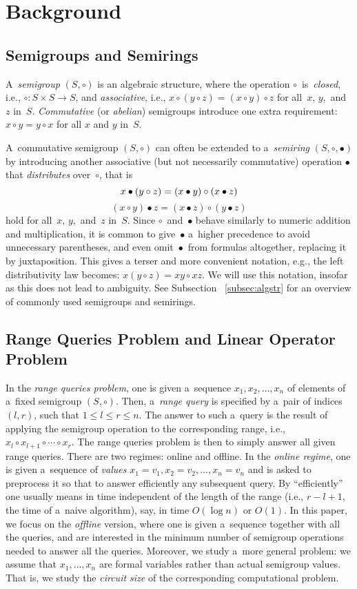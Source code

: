 \documentclass[11pt,letterpaper]{article}
\begin{document}
\section{Background}
\subsection{Semigroups and Semirings}
A~\emph{semigroup} $(S, \circ)$ is an algebraic structure, where
the operation
$\circ$~is~\emph{closed}, i.e., $\circ : S\times S \rightarrow S$,
and
\emph{associative}, i.e.,
$x \circ (y \circ z) = (x \circ y) \circ z$ for all~$x$, $y$,~and~$z$
in~$S$.
\emph{Commutative} (or \emph{abelian}) semigroups introduce
one extra requirement: $x \circ y = y \circ x$ for all $x$ and $y$
in~$S$.

A~commutative semigroup $(S, \circ)$ can often be extended to
a~\emph{semiring} $(S, \circ, \bullet)$ by introducing
another associative (but not necessarily
commutative)
operation $\bullet$ that \emph{distributes} over~$\circ$, that is
\[
x \bullet (y \circ z) = (x \bullet y) \circ (x \bullet z)\\
\]
\[
(x \circ y) \bullet z = (x \bullet z) \circ (y \bullet z)
\]
hold for all~$x$, $y$,~and~$z$ in~$S$.
Since $\circ$~and~$\bullet$ behave
similarly to numeric addition and multiplication, it is common to
give~$\bullet$ a~higher precedence to avoid
unnecessary parentheses, and even omit~$\bullet$~from
formulas altogether, replacing it by juxtaposition.
This gives a terser and
more convenient notation, e.g., the left distributivity law becomes:
$x (y \circ z) = x y \circ x z$. We will use this notation,
insofar as this does not lead to ambiguity. See Subsection~
\ref{subsec:algstr} for an overview of commonly used
semigroups and semirings.

\subsection{Range Queries Problem and Linear Operator Problem}
In the {\em range queries problem}, one is given
a~sequence $x_1, x_2, \dotsc, x_n$ of
elements of a~fixed semigroup $(S, \circ)$.
Then, a~\emph{range query} is
specified by a~pair of indices $(l,r)$, such that $1 \le l \le r \le n$.
The answer to such a~query is the result of applying the semigroup
operation to the
corresponding range, i.e., $x_l \circ x_{l+1} \circ \dotsb \circ x_r$.
The range queries problem is then to simply answer all given range
queries.
There are two
regimes: online and offline. In the {\em online regime}, one is given
a~sequence of {\em values}
$x_1=v_1, x_2=v_2, \dotsc, x_n=v_n$ and is asked to preprocess
it so that to
answer efficiently any subsequent query.
By ``efficiently'' one usually
means in time independent of the length of the range
(i.e., $r-l+1$, the time
of a~naive algorithm), say, in time $O(\log n)$ or $O(1)$.
In this paper, we
focus on the {\em offline} version, where one is given a~sequence
together with
all the queries, and are interested in the minimum number of
semigroup
operations needed to answer all the queries. Moreover, we study
a~more general
problem: we assume that $x_1, \dotsc, x_n$ are formal variables
rather than
actual semigroup values. That is, we study the {\em circuit size} of
the corresponding
computational problem.
\end{document}
